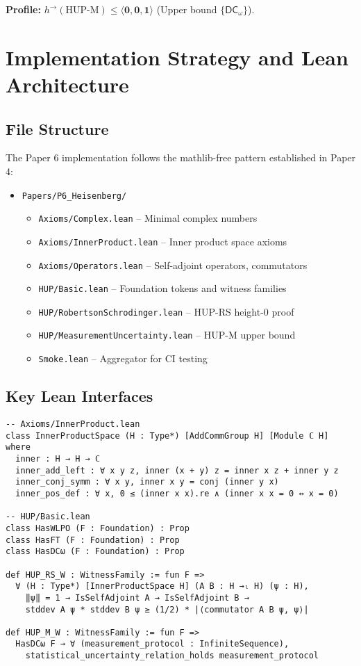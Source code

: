 \documentclass[11pt]{article}
\newcommand{\DCw}{\mathsf{DC}_{\omega}}
\newcommand{\hzero}{\mathbf{0}}
\newcommand{\hone}{\mathbf{1}}
\newcommand{\DCwonly}{\langle \hzero,\hzero,\hone\rangle}
\theoremstyle{plain}
\theoremstyle{definition}
\theoremstyle{remark}
\begin{document}
\noindent\textbf{Profile:} $h^{\to}(\text{HUP-M}) \leq \DCwonly$ (Upper bound $\{\DCw\}$).

\section{Implementation Strategy and Lean Architecture}

\subsection{File Structure}

The Paper 6 implementation follows the mathlib-free pattern established in Paper 4:

\begin{itemize}
\item \texttt{Papers/P6\_Heisenberg/}
  \begin{itemize}
  \item \texttt{Axioms/Complex.lean} -- Minimal complex numbers
  \item \texttt{Axioms/InnerProduct.lean} -- Inner product space axioms  
  \item \texttt{Axioms/Operators.lean} -- Self-adjoint operators, commutators
  \item \texttt{HUP/Basic.lean} -- Foundation tokens and witness families
  \item \texttt{HUP/RobertsonSchrodinger.lean} -- HUP-RS height-0 proof
  \item \texttt{HUP/MeasurementUncertainty.lean} -- HUP-M upper bound
  \item \texttt{Smoke.lean} -- Aggregator for CI testing
  \end{itemize}
\end{itemize}

\subsection{Key Lean Interfaces}

\begin{verbatim}
-- Axioms/InnerProduct.lean
class InnerProductSpace (H : Type*) [AddCommGroup H] [Module ℂ H] where
  inner : H → H → ℂ  
  inner_add_left : ∀ x y z, inner (x + y) z = inner x z + inner y z
  inner_conj_symm : ∀ x y, inner x y = conj (inner y x)  
  inner_pos_def : ∀ x, 0 ≤ (inner x x).re ∧ (inner x x = 0 ↔ x = 0)

-- HUP/Basic.lean  
class HasWLPO (F : Foundation) : Prop
class HasFT (F : Foundation) : Prop  
class HasDCω (F : Foundation) : Prop

def HUP_RS_W : WitnessFamily := fun F => 
  ∀ (H : Type*) [InnerProductSpace H] (A B : H →ₗ H) (ψ : H),
    ‖ψ‖ = 1 → IsSelfAdjoint A → IsSelfAdjoint B →
    stddev A ψ * stddev B ψ ≥ (1/2) * |⟨commutator A B ψ, ψ⟩|

def HUP_M_W : WitnessFamily := fun F =>
  HasDCω F → ∀ (measurement_protocol : InfiniteSequence), 
    statistical_uncertainty_relation_holds measurement_protocol
\end{verbatim}
\end{document}
